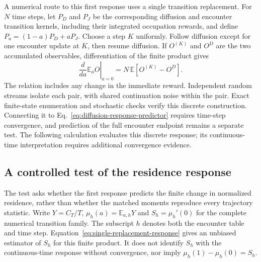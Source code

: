 \documentclass[aps,prd,reprint,amsmath,amssymb,superscriptaddress,nofootinbib,longbibliography,floatfix]{revtex4-2}
\begin{document}
A numerical route to this first response uses a single transition replacement. For $N$ time steps, let $P_D$ and $P_J$ be the corresponding diffusion and encounter transition kernels, including their integrated occupation rewards, and define $P_a=(1-a)P_D+aP_J$. Choose a step $K$ uniformly. Follow diffusion except for one encounter update at $K$, then resume diffusion. If $O^{(K)}$ and $O^D$ are the two accumulated observables, differentiation of the finite product gives
\begin{equation}
\left.\frac{d}{da}\mathbb E_a O\right|_{a=0}
=N\,\mathbb E\!\left[O^{(K)}-O^D\right].
\label{eq:single-replacement-response}
\end{equation}
The relation includes any change in the immediate reward. Independent random streams isolate each pair, with shared continuation noise within the pair. Exact finite-state enumeration and stochastic checks verify this discrete construction. Connecting it to Eq.~\eqref{eq:diffusion-response-predictor} requires time-step convergence, and prediction of the full encounter endpoint remains a separate test. The following calculation evaluates this discrete response; its continuous-time interpretation requires additional convergence evidence.

\subsection{A controlled test of the residence response}\label{sec:response-test}

The test asks whether the first response predicts the finite change in normalized residence, rather than whether the matched moments reproduce every trajectory statistic. Write $Y=C_T/T$, $\mu_h(a)=\mathbb E_{a,h}Y$ and $S_h=\mu_h'(0)$ for the complete numerical transition family. The subscript $h$ denotes both the encounter table and time step. Equation~\eqref{eq:single-replacement-response} gives an unbiased estimator of $S_h$ for this finite product. It does not identify $S_h$ with the continuous-time response without convergence, nor imply $\mu_h(1)-\mu_h(0)=S_h$.
\end{document}
